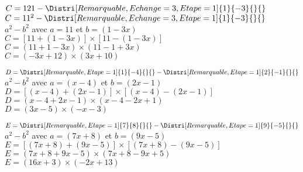 \begin{corrige}
\begin{enumerate}
        \setcounter{enumi}{2}
        \begin{itemize}
            \def\item{}
            \begin{spacing}{1.2}
                \item $C= 121- \Distri[Remarquable,Echange=3,Etape=1]{1}{-3}{}{}$\\
                {\red 
                $C = 11^2- \Distri[Remarquable,Echange=3,Etape=1]{1}{-3}{}{}$\\
                $a^2-b^2$ avec $a=11$ et $b=(1-3x)$\\
                $C = [11+(1-3x)]\times [11-(1-3x)]$\\
                $C = (11+1-3x)\times (11-1+3x)$\\
                $C = (-3x+12)\times (3x+10)$
                }
                
                \smallskip
                \item $D= \Distri[Remarquable,Etape=1]{1}{-4}{}{} - \Distri[Remarquable,Etape=1]{2}{-1}{}{}$\\
                {\red                 
                $a^2-b^2$ avec $a=(x-4)$ et $b=(2x-1)$\\
                $D = [(x-4)+(2x-1)]\times [(x-4)-(2x-1)]$\\
                $D = (x-4+2x-1)\times (x-4-2x+1)$\\
                $D = (3x-5)\times (-x-3)$
                }
                
                \smallskip
                \item $E= \Distri[Remarquable,Etape=1]{7}{8}{}{} -  \Distri[Remarquable,Etape=1]{9}{-5}{}{}$\\
                {\red                 
                $a^2-b^2$ avec $a=(7x+8)$ et $b=(9x-5)$\\
                $E = [(7x+8)+(9x-5)]\times [(7x+8)-(9x-5)]$\\
                $E = (7x+8+9x-5)\times (7x+8-9x+5)$\\
                $E = (16x+3)\times (-2x+13)$
                }


\end{spacing}
\end{itemize}
\end{enumerate}
\end{corrige}
